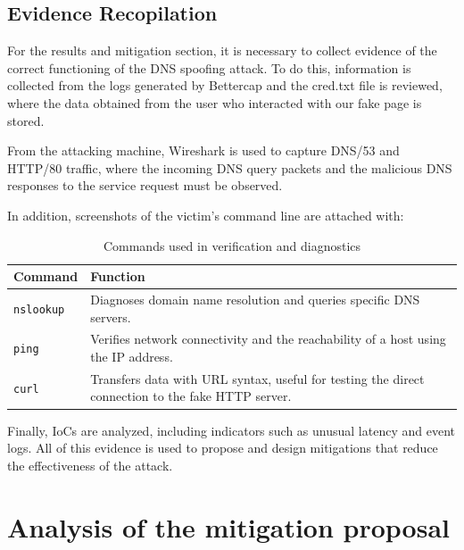 \documentclass[conference]{IEEEtran}
\begin{document}
\subsection{Evidence Recopilation}
For the results and mitigation section, it is necessary to collect evidence of the correct functioning of the DNS spoofing attack. To do this, information is collected from the logs generated by Bettercap and the cred.txt file is reviewed, where the data obtained from the user who interacted with our fake page is stored.

From the attacking machine, Wireshark is used to capture DNS/53 and HTTP/80 traffic, where the incoming DNS query packets and the malicious DNS responses to the service request must be observed.

In addition, screenshots of the victim's command line are attached with:

\begin{table}[htbp]
\caption{Commands used in verification and diagnostics}
\label{tab:cmdcheck}
\begin{center}
\begin{tabular}{@{}p{1.2cm} p{6cm}@{}} \hline
\textbf{Command} & \textbf{Function} \\ \hline
\texttt{nslookup} & Diagnoses domain name resolution and queries specific DNS servers. \\
\texttt{ping} & Verifies network connectivity and the reachability of a host using the IP address. \\
\texttt{curl} & Transfers data with URL syntax, useful for testing the direct connection to the fake HTTP server. \\
\hline
\end{tabular}
\end{center}
\end{table}


Finally, IoCs are analyzed, including indicators such as unusual latency and event logs. All of this evidence is used to propose and design mitigations that reduce the effectiveness of the attack.


\section{Analysis of the mitigation proposal}
\end{document}
